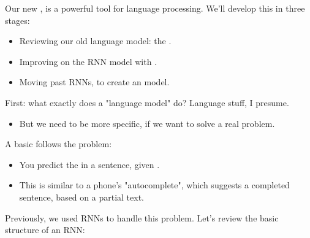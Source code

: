         Our new , is a powerful tool for language processing. We'll develop this in three stages:

        \begin{itemize}
            \item Reviewing our old language model: the .
            
            \item Improving on the RNN model with .

            \item Moving past RNNs, to create an  model.
        \end{itemize}

        First: what exactly does a "language model" do? Language stuff, I presume. 

        \begin{itemize}
            \item But we need to be more specific, if we want to solve a real problem.\\
        \end{itemize}

        \begin{definition}
            A basic  follows the  problem:
            
            \begin{itemize}
                \item You predict the  in a sentence, given .
            \end{itemize}
        \end{definition}

        \begin{itemize}
            \item \miniex This is similar to a phone's "autocomplete", which suggests a completed sentence, based on a partial text.
        \end{itemize}

        Previously, we used RNNs to handle this problem. Let's review the basic structure of an RNN:


